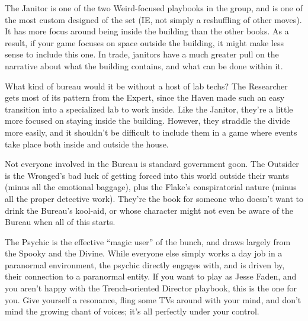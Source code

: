 \documentclass[10pt,oneside,landscape]{memoir}
\begin{document}
\begin{multicols}{3}
{The Janitor is one of the two Weird-focused playbooks in the group, and is one of the most custom designed of the set (IE, not simply a reshuffling of other moves).  It has more focus around being inside the building than the other books.  As a result, if your game focuses on space outside the building, it might make less sense to include this one.  In trade, janitors have a much greater pull on the narrative about what the building contains, and what can be done within it.}

{What kind of bureau would it be without a host of lab techs?  The Researcher gets most of its pattern from the Expert, since the Haven made such an easy transition into a specialized lab to work inside.  Like the Janitor, they’re a little more focused on staying inside the building.  However, they straddle the divide more easily, and it shouldn’t be difficult to include them in a game where events take place both inside and outside the house.}

{Not everyone involved in the Bureau is standard government goon.  The Outsider is the Wronged’s bad luck of getting forced into this world outside their wants (minus all the emotional baggage), plus the Flake’s conspiratorial nature (minus all the proper detective work).  They’re the book for someone who doesn’t want to drink the Bureau’s kool-aid, or whose character might not even be aware of the Bureau when all of this starts.}

{The Psychic is the effective “magic user” of the bunch, and draws largely from the Spooky and the Divine.  While everyone else simply works a day job in a paranormal environment, the psychic directly engages with, and is driven by, their connection to a paranormal entity.  If you want to play as Jesse Faden, and you aren’t happy with the Trench-oriented Director playbook, this is the one for you.  Give yourself a resonance, fling some TVs around with your mind, and don’t mind the growing chant of voices; it’s all perfectly under your control.}

\end{multicols}
\pagebreak

\fontsize{10}{12}\selectfont


\pagebreak


\pagebreak
\end{document}
